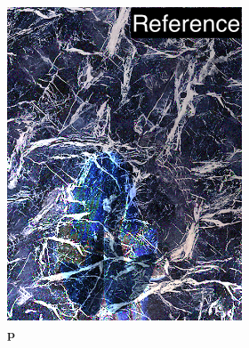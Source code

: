 \begin{figure}[]
\begin{subfigure}{\textwidth}
\begin{subfigure}{0.24\textwidth}
            \includegraphics[width=\textwidth]{images/04-experiment02/human/marble/pixel_im_label.jpg}
            \caption*{\(\bm{p}\)}
        \end{subfigure}
        \hfill
        \begin{subfigure}{0.24\textwidth}
            \centering

\end{subfigure}
\end{subfigure}
\end{figure}
